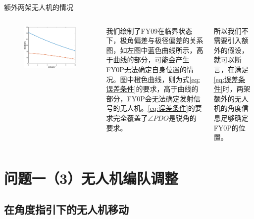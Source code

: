 \documentclass[aspectratio=169]{beamer}
\begin{document}
\begin{frame}{额外两架无人机的情况}
    \begin{columns}
        \begin{figure}[!ht]
            \centering
            \includegraphics[width = \textwidth]{图片/极角极径偏差.eps}
        \end{figure}

        我们绘制了FY09在临界状态下，极角偏差与极径偏差的关系图，如左图中蓝色曲线所示，高于曲线的部分，可能会产生FY0P无法确定自身位置的情况。图中橙色曲线，则为式\ref{eq:误差条件}的要求，高于曲线的部分，FY0P会无法确定发射信号的无人机。\ref{eq:误差条件}的要求完全覆盖了$\angle PDO$是锐角的要求。
        
        所以我们不需要引入额外的假设，就可以断言，在满足\ref{eq:误差条件}时，两架额外的无人机的角度信息足够确定FY0P的位置。
    \end{columns}
\end{frame}



\section[问题1-3]{问题一（3）无人机编队调整}

\subsection{在角度指引下的无人机移动}
\end{document}
